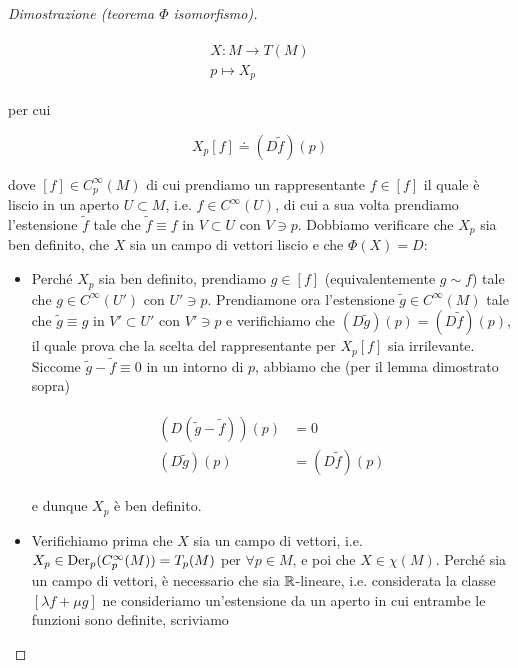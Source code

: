 \begin{proof}[Dimostrazione (teorema $ \Phi $ isomorfismo)]
\begin{itemize}
	\begin{align}
		\begin{split}
			X : M \to T(M)\\
			p \mapsto X_{p}
		\end{split}
	\end{align}

	per cui
	
	\begin{equation}
		X_{p} [f] \doteq (D \tilde{f})(p)
	\end{equation}

	dove $ [f] \in C_{p}^{\infty}(M) $ di cui prendiamo un rappresentante $ f \in [f] $ il quale è liscio in un aperto $ U \subset M $, i.e. $ f \in C^{\infty}(U) $, di cui a sua volta prendiamo l'estensione $ \tilde{f} $ tale che $ \tilde{f} \equiv f $ in $ V \subset U $ con $ V \ni p $. Dobbiamo verificare che $ X_{p} $ sia ben definito, che $ X $ sia un campo di vettori liscio e che $ \Phi(X) = D $:
	
	\begin{itemize}
		\item Perché $ X_{p} $ sia ben definito, prendiamo $ g \in [f] $ (equivalentemente $ g \sim f $) tale che $ g \in C^{\infty}(U') $ con $ U' \ni p $. Prendiamone ora l'estensione $ \tilde{g} \in C^{\infty}(M) $ tale che $ \tilde{g} \equiv g $ in $ V' \subset U' $ con $ V' \ni p $ e verifichiamo che $ (D \tilde{g})(p) = (D \tilde{f})(p) $, il quale prova che la scelta del rappresentante per $ X_{p} [f] $ sia irrilevante. Siccome $ \tilde{g} - \tilde{f} \equiv 0 $ in un intorno di $ p $, abbiamo che (per il lemma dimostrato sopra)
		
		\begin{align}
			\begin{split}
				(D (\tilde{g} - \tilde{f}))(p) &= 0\\
				(D \tilde{g})(p) &= (D \tilde{f})(p)
			\end{split}
		\end{align}
		
		e dunque $ X_{p} $ è ben definito.
		
		\item Verifichiamo prima che $ X $ sia un campo di vettori, i.e. $ X_{p} \in \operatorname{Der}_{p}(C_{p}^{\infty}(M)) = T_{p}(M) $ per $ \forall p \in M $, e poi che $ X \in \chi(M) $. Perché sia un campo di vettori, è necessario che sia $ \mathbb{R} $-lineare, i.e. considerata la classe $ [\lambda f + \mu g] $ ne consideriamo un'estensione da un aperto in cui entrambe le funzioni sono definite, scriviamo
		

\end{itemize}
\end{itemize}
\end{proof}
